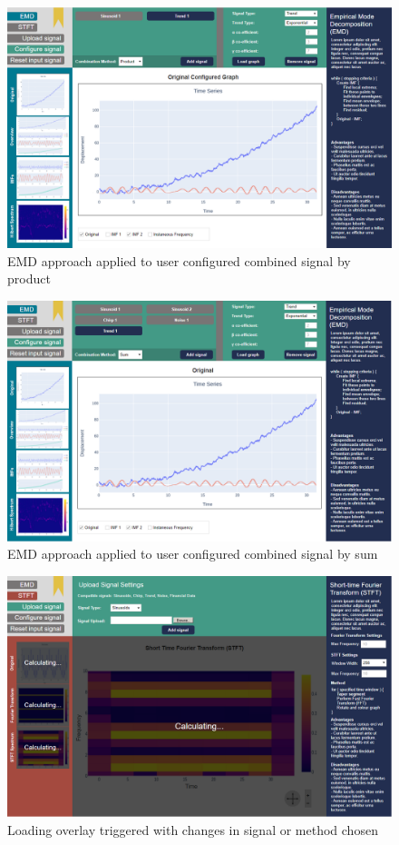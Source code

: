 \documentclass[
  english,
  paper=a4,
  oneside  ,captions=tableheading
]{scrbook}
\begin{document}
\begin{figure}
\centering
\includegraphics{img/EMD_multiple_product_signal.PNG}
\caption{EMD approach applied to user configured combined signal by
product}
\end{figure}

\begin{figure}
\centering
\includegraphics{img/EMD_multiple_sum_signal.PNG}
\caption{EMD approach applied to user configured combined signal by sum}
\end{figure}

\begin{figure}
\centering
\includegraphics{img/Loading_graphs.PNG}
\caption{Loading overlay triggered with changes in signal or method
chosen}
\end{figure}
\end{document}
